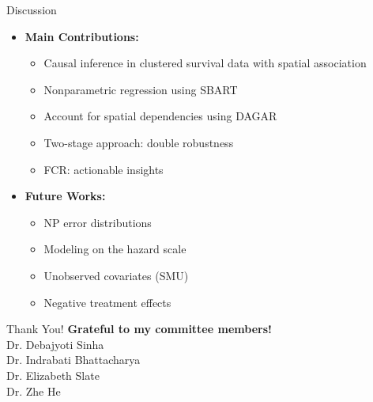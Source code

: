 \documentclass{beamer}
\begin{document}
\begin{frame}{Discussion}
\begin{itemize}
\vfill    \item \textbf{Main Contributions:}

\begin{itemize}
\vfill     \item Causal inference in clustered survival data with spatial association
 \vfill    \item Nonparametric regression using SBART
 \vfill    \item Account for spatial dependencies using DAGAR
 \vfill    \item Two-stage approach: double robustness
 \vfill    \item FCR: actionable insights
\end{itemize}
\vfill \item \textbf{Future Works:}
\begin{itemize}
\vfill     \item NP error distributions
 \vfill    \item Modeling on the hazard scale
 \vfill    \item Unobserved covariates (SMU)
 \vfill    \item Negative treatment effects
\end{itemize}

\end{itemize}    
\end{frame}
\begin{frame}{Thank You!}
    \centering
     \textbf{Grateful to my committee members!}\\


    \centering
    Dr. Debajyoti Sinha \\
    Dr. Indrabati Bhattacharya \\
    Dr. Elizabeth Slate \\
    Dr. Zhe He
    
    
\end{frame}
\end{document}
